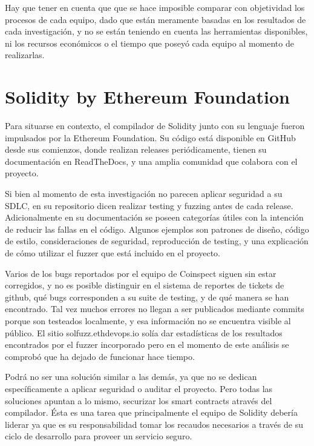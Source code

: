 Hay que tener en cuenta que que se hace imposible comparar con objetividad los procesos de cada equipo, dado que están meramente basadas en los resultados de cada investigación, y no se están teniendo en cuenta las herramientas disponibles, ni los recursos económicos o el tiempo que poseyó cada equipo al momento de realizarlas.\\

\section{Solidity by Ethereum Foundation}

Para situarse en contexto, el compilador de Solidity junto con su lenguaje fueron impulsados por la Ethereum Foundation. Su código está disponible en GitHub\cite{SolidityGitHub} desde sus comienzos, donde realizan releases periódicamente, tienen su documentación en ReadTheDocs\cite{ReadTheDocsSolidity}, y una amplia comunidad que colabora con el proyecto.

Si bien al momento de esta investigación no parecen aplicar seguridad a su SDLC, en su repositorio dicen realizar testing y fuzzing antes de cada release. Adicionalmente en su documentación se poseen categorías útiles con la intención de reducir las fallas en el código. Algunos ejemplos son patrones de diseño, código de estilo, consideraciones de seguridad, reproducción de testing, y una explicación de cómo utilizar el fuzzer que está incluido en el proyecto.

Varios de los bugs reportados por el equipo de Coinspect siguen sin estar corregidos, y no es posible distinguir en el sistema de reportes de tickets de github, qué bugs corresponden a su suite de testing, y de qué manera se han encontrado. Tal vez muchos errores no llegan a ser publicados mediante commits porque son testeados localmente, y esa información no se encuentra visible al público. El sitio solfuzz.ethdevops.io\cite{SolfuzzSite} solía dar estadísticas de los resultados encontrados por el fuzzer incorporado pero en el momento de este análisis se comprobó que ha dejado de funcionar hace tiempo.

Podrá no ser una solución similar a las demás, ya que no se dedican específicamente a aplicar seguridad o auditar el proyecto. Pero todas las soluciones apuntan a lo mismo, securizar los smart contracts através del compilador. Ésta es una tarea que principalmente el equipo de Solidity debería liderar ya que es su responsabilidad tomar los recaudos necesarios a través de su ciclo de desarrollo para proveer un servicio seguro.

